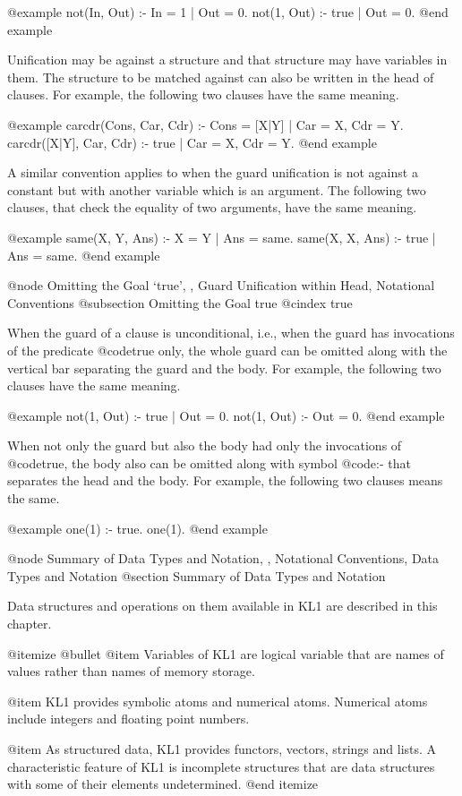 {@example
not(In, Out) :- In = 1 | Out = 0.
not(1, Out) :- true | Out = 0.
@end example

Unification may be against a structure and that structure may have
variables in them.  The structure to be matched against can also be
written in the head of clauses.  For example, the following two clauses
have the same meaning.

@example
carcdr(Cons, Car, Cdr) :- Cons = [X|Y] | Car = X, Cdr = Y.
carcdr([X|Y], Car, Cdr) :- true | Car = X, Cdr = Y.
@end example

A similar convention applies to when the guard unification is not
against a constant but with another variable which is an argument.  The
following two clauses, that check the equality of two arguments, have
the same meaning.

@example
same(X, Y, Ans) :- X = Y | Ans = same.
same(X, X, Ans) :- true | Ans = same.
@end example

@node Omitting the Goal `true',  , Guard Unification within Head, Notational Conventions
@subsection Omitting the Goal true
@cindex true

When the guard of a clause is unconditional, i.e., when the guard has
invocations of the predicate @code{true} only, the whole guard can be
omitted along with the vertical bar separating the guard and the body.
For example, the following two clauses have the same meaning.

@example
not(1, Out) :- true | Out = 0.
not(1, Out) :- Out = 0.
@end example

When not only the guard but also the body had only the invocations of
@code{true}, the body also can be omitted along with symbol @code{:-}
that separates the head and the body.  For example, the following two
clauses means the same.

@example
one(1) :- true.
one(1).
@end example

@node Summary of Data Types and Notation,  , Notational Conventions, Data Types and Notation
@section Summary of Data Types and Notation

Data structures and operations on them available in KL1 are described in
this chapter.

@itemize @bullet
@item
Variables of KL1 are logical variable that are names of values rather
than names of memory storage.

@item
KL1 provides symbolic atoms and numerical atoms.  Numerical atoms
include integers and floating point numbers.

@item
As structured data, KL1 provides functors, vectors, strings and lists.
A characteristic feature of KL1 is incomplete structures that are data
structures with some of their elements undetermined.
@end itemize

}
